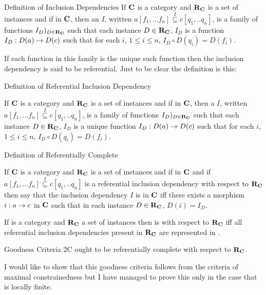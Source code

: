 \begin{frame}{Definition of Inclusion Dependencies}
If $\textbf{C}$ is a category and $\textbf{R}_{\textbf{C}}$ is a set of instances 
and if
\fnsourceqnsource
in $\textbf{C}$, then an  $I$, written $a[f_1,...f_n] \overset{I}{\subseteq} c[q_1,..q_n]$, is a family of functions $I_D)_{D \in \textbf{R}_{\textbf{C}}}$
such that each instance $D \in \textbf{R}_{\textbf{C}}$, $I_D$ is a function $I_D : D(a) \rightarrow D(c)$ such that
for each $i$, $1 \leq i \le n$, $I_D \circ D(q_i) = D(f_i)$.

If each function in this family is the unique such function then the inclusion dependency is said to be referential. Just to be clear the definition is this:
\end{frame}

\begin{frame}{Definition of Referential Inclusion Dependency}
\begin{definition}
If $\textbf{C}$ is a category and $\textbf{R}_{\textbf{C}}$ is a set of instances 
and if
\fnsourceqnsource
in $\textbf{C}$, then a  $I$, written $a[f_1,...f_n] \overset{I}{\subseteq} c[q_1,..q_n]$, is a family of functions $I_D)_{D \in \textbf{R}_{\textbf{C}}}$
such that each instance $D \in \textbf{R}_{\textbf{C}}$, $I_D$ is a unique function $I_D : D(a) \rightarrow D(c)$ such that
for each $i$, $1 \leq i \le n$, $I_D \circ D(q_i) = D(f_i)$.
\end{definition}
\end{frame}

\begin{frame}{Definition of Referentially Complete}
\begin{definition}
If $\textbf{C}$ is a category and $\textbf{R}_{\textbf{C}}$ is a set of instances and if
\fnsourceqnsource
in $\textbf{C}$ and if $a[f_1,...f_n] \overset{I}{\subseteq} c[q_1,..q_n]$ is a referential inclusion dependency
with respect  to $\textbf{R}_{\textbf{C}}$ then say that the inclusion dependency $I$ is  in $\textbf{C}$
iff there exists a morphism $i:a \rightarrow c$ in $\textbf{C}$ such that in each instance $D \in \textbf{R}_{\textbf{C}}$, $D(i) = I_D$. 
\end{definition}
If \catcw is a category and $\textbf{R}_{\textbf{C}}$ a set of instances then 
\catcw is  with respect to $\textbf{R}_{\textbf{C}}$ 
iff all referential inclusion dependencies present in $\textbf{R}_{\textbf{C}}$ are represented in \catc.
\end{frame}

\begin{frame}{Goodness Criteria 2C}
 \IfSforCwithRCwords 
\catcw ought to be referentially complete with respect to $\textbf{R}_{\textbf{C}}$.

I would like to show that this goodness criteria follows from the criteria of maximal constrainedness
but I have managed to prove this only in the case that \catcw is locally finite. 
\end{frame}

